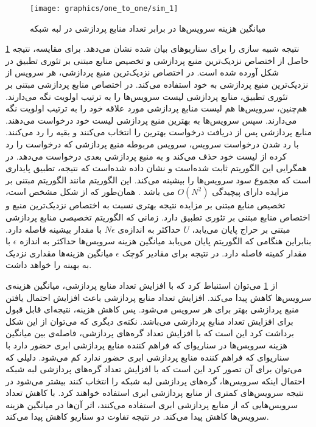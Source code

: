     \begin{figure}
      \centerline{\texttt{[image: graphics/one\_to\_one/sim\_1]}}
      \caption{میانگین هزینه سرویس‌ها در برابر تعداد منابع پردازشی در لبه شبکه}
      \label{fig:ono_to_one:sim1}
    \end{figure}

    \cref{fig:ono_to_one:sim1} نتیجه شبیه سازی را برای سناریو‌های بیان شده نشان می‌دهد.
    برای مقایسه، نتیجه حاصل از اختصاص نزدیک‌ترین منبع پردازشی و تخصیص منابع مبتنی بر تئوری تطبیق \cite{gale1962college} در شکل آورده شده است.
    در اختصاص نزدیک‌ترین منبع پردازشی، هر سرویس از نزدیک‌ترین منبع پردازشی به خود استفاده می‌کند.
    در اختصاص منابع پردازشی مبتنی بر تئوری تطبیق، منابع پردازشی لیست سرویس‌ها را به ترتیب اولویت نگه می‌دارند.
    هم‌چنین، سرویس‌ها هم لیست منابع پردازشی مورد علاقه خود را به ترتیب اولویت نگه می‌دارند.
    سپس سرویس‌ها به بهترین منبع پردازشی لیست خود درخواست می‌دهند.
    منابع پردازشی پس از دریافت درخواست بهترین را انتخاب می‌کنند و بقیه را رد می‌کنند.
    با رد شدن درخواست سرویس، سرویس مربوطه منبع پردازشی که درخواست را رد کرده از لیست خود حذف می‌کند و به منبع پردازشی بعدی درخواست می‌دهد.
    در \cite{gale1962college} همگرایی این الگوریتم ثابت شده‌است و نشان داده شده‌است که نتیجه، تطبیق پایداری است که مجموع سود سرویس‌ها را بیشینه می‌کند.
    این الگوریتم مانند الگوریتم مبتنی بر مزایده دارای پیچیدگی $O(N^2)$ می باشد \cite{mcvitie1970stable}.
    همان‌طور که از شکل مشخص است، تخصیص منابع مبتنی بر مزایده نتیجه بهتری نسبت به اختصاص نزدیک‌ترین منبع و اختصاص منابع مبتنی بر تئوری تطبیق دارد.
    زمانی که الگوریتم تخصیصی منابع پردازشی مبتنی بر حراج پایان می‌یابد، $U$ حداکثر به اندازه‌ی $N\epsilon$ با مقدار بیشینه فاصله دارد.
    بنابراین هنگامی که الگوریتم پایان می‌یابد میانگین هزینه سرویس‌ها حداکثر به اندازه $\epsilon$ با مقدار کمینه فاصله دارد.
    در نتیجه برای مقادیر کوچک $\epsilon$ میانگین هزینه‌ها مقداری نزدیک به بهینه را خواهد داشت.

    از \cref{fig:ono_to_one:sim1} می‌توان استنباط کرد که با افزایش تعداد منابع پردازشی، میانگین هزینه‌ی سرویس‌ها کاهش پیدا می‌کند.
    افزایش تعداد منابع پردازشی باعث افزایش احتمال یافتن منبع پردازشی بهتر برای هر سرویس می‌شود.
    پس کاهش هزینه، نتیجه‌ای قابل قبول برای افزایش تعداد منابع پردازشی می‌باشد.
    نکته‌ی دیگری که می‌توان از این شکل برداشت کرد این است که با افزایش تعداد گره‌های پردازشی، فاصله‌ی بین میانگین هزینه سرویس‌ها در سناریو‌ای که فراهم کننده منابع پردازشی ابری حضور دارد با سناریو‌ای که فراهم کننده منابع پردازشی ابری حضور ندارد کم می‌شود.
    دلیلی که می‌توان برای آن تصور کرد این است که با افزایش تعداد گره‌های پردازشی لبه شبکه احتمال اینکه سرویس‌ها، گره‌های پردازشی لبه شبکه را انتخاب کنند بیشتر می‌شود در نتیجه سرویس‌های کمتری از منابع پردازشی ابری استفاده خواهند کرد.
    با کاهش تعداد سرویس‌هایی که از منابع پردازشی ابری استفاده می‌کنند، اثر آن‌ها در میانگین هزینه سرویس‌ها کاهش پیدا می‌کند.
    در نتیجه تفاوت دو سناریو کاهش پیدا می‌کند.


